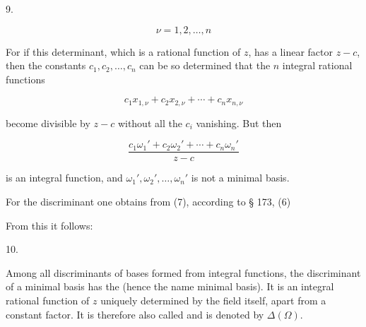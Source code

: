 9. 

\[
\nu = 1, 2, \ldots, n
\]




For if this determinant, which is a rational function
of $z$, has a linear factor $z - c$, then the constants
$c_1, c_2, \ldots, c_n$ can be so determined that the $n$ integral rational functions


\[
c_1 x_{1,\nu} + c_2 x_{2,\nu} + \cdots + c_n x_{n,\nu}
\]

become divisible by $z - c$ without all the $c_i$ vanishing.
But then

\[
\frac{c_1 \omega_1' + c_2 \omega_2' + \cdots + c_n \omega_n'}{z - c}
\]

is an integral function, and $\omega_1', \omega_2', \ldots, \omega_n'$ is not a minimal basis.

For the discriminant one obtains from (7), according to § 173, (6)


From this it follows:

10. 

Among all discriminants of bases formed from integral functions,
 the discriminant of a minimal basis has the  (hence the name minimal basis). It is an integral
rational function of $z$ uniquely determined by the field
itself, apart from a constant factor. It is therefore also called
 and is denoted
by $\varDelta(\Omega)$.
